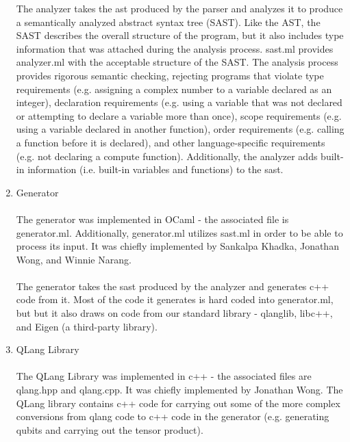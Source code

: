 \begin{enumerate}
The analyzer takes the ast produced by the parser and analyzes it to produce a semantically analyzed abstract syntax tree (SAST). Like the AST, the SAST describes the overall structure of the program, but it also includes type information that was attached during the analysis process. sast.ml provides analyzer.ml with the acceptable structure of the SAST. The analysis process provides rigorous semantic checking, rejecting programs that violate type requirements (e.g. assigning a complex number to a variable declared as an integer), declaration requirements (e.g. using a variable that was not declared or attempting to declare a variable more than once), scope requirements (e.g. using a variable declared in another function), order requirements (e.g. calling a function before it is declared), and other language-specific requirements (e.g. not declaring a compute function). Additionally, the analyzer adds built-in information (i.e. built-in variables and functions) to the sast.\\
\item Generator\\\\
The generator was implemented in OCaml - the associated file is generator.ml. Additionally, generator.ml utilizes sast.ml in order to be able to process its input. It was chiefly implemented by Sankalpa Khadka, Jonathan Wong, and Winnie Narang.\\\\
The generator takes the sast produced by the analyzer and generates c++ code from it. Most of the code it generates is hard coded into generator.ml, but but it also draws on code from our standard library - qlanglib, libc++, and Eigen (a third-party library).\\
\item QLang Library\\\\
The QLang Library was implemented in c++ - the associated files are qlang.hpp and qlang.cpp. It was chiefly implemented by Jonathan Wong. The QLang library contains c++ code for carrying out some of the more complex conversions from qlang code to c++ code in the generator (e.g. generating qubits and carrying out the tensor product).
\end{enumerate}
